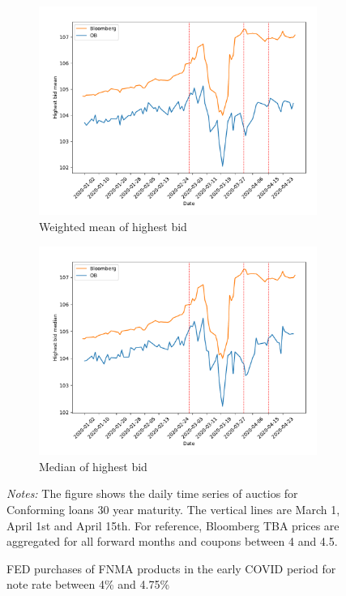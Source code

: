 \documentclass[11pt,a4paper]{article}
\begin{document}
\begin{figure}[h]
\begin{subfigure}[b]{0.49\textwidth}
      \includegraphics[width=0.998\textwidth]{../results/figures/w_winner_bid_mean_mat30_loan1_timeseries_nr_4_4.75.pdf}
      \caption{ Weighted mean of highest bid}
     \end{subfigure}
     \begin{subfigure}[b]{0.49\textwidth}
      \includegraphics[width=0.998\textwidth]{../results/figures/winner_bid_median_mat30_loan1_timeseries_nr_4_4.75.pdf}
      \caption{ Median of highest bid}
     \end{subfigure}
   \caption{FED purchases of FNMA products in the early COVID period for note rate between 4\% and 4.75\%}
   \begin{minipage}{\textwidth}
      \footnotesize{\textit{Notes:} The figure shows the daily time series of auctios for Conforming loans 30 year maturity. The vertical lines are March 1, April 1st and April 15th. For reference, Bloomberg TBA prices are aggregated for all forward months and coupons between 4 and 4.5. } 
      \end{minipage}
\end{figure}
\end{document}
